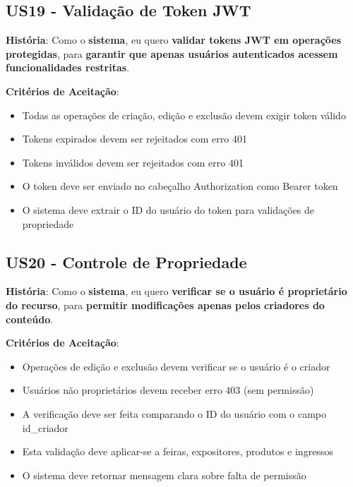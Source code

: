 \documentclass[12pt,a4paper]{article}
\begin{document}
\subsection{US19 - Validação de Token JWT}

\textbf{História}: Como o \textbf{sistema}, eu quero \textbf{validar tokens JWT em operações protegidas}, para \textbf{garantir que apenas usuários autenticados acessem funcionalidades restritas}.

\textbf{Critérios de Aceitação}:
\begin{itemize}
    \item Todas as operações de criação, edição e exclusão devem exigir token válido
    \item Tokens expirados devem ser rejeitados com erro 401
    \item Tokens inválidos devem ser rejeitados com erro 401
    \item O token deve ser enviado no cabeçalho Authorization como Bearer token
    \item O sistema deve extrair o ID do usuário do token para validações de propriedade
\end{itemize}

\subsection{US20 - Controle de Propriedade}

\textbf{História}: Como o \textbf{sistema}, eu quero \textbf{verificar se o usuário é proprietário do recurso}, para \textbf{permitir modificações apenas pelos criadores do conteúdo}.

\textbf{Critérios de Aceitação}:
\begin{itemize}
    \item Operações de edição e exclusão devem verificar se o usuário é o criador
    \item Usuários não proprietários devem receber erro 403 (sem permissão)
    \item A verificação deve ser feita comparando o ID do usuário com o campo id\_criador
    \item Esta validação deve aplicar-se a feiras, expositores, produtos e ingressos
    \item O sistema deve retornar mensagem clara sobre falta de permissão
\end{itemize}
\end{document}
